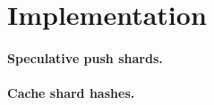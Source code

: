 \section{Implementation}
\label{sec:impl}

\paragraph{Speculative push shards.}

\paragraph{Cache shard hashes.}